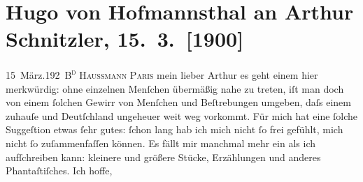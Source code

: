 

         
         \renewcommand{\erwaehntePersonen}{Personen: Richard Beer-Hofmann, Anatole France, Paul Goldmann, Hugo von Hofmannsthal, Hugo August von Hofmannsthal, Maurice Maeterlinck, Theofrastus Bombastus Paracelsus, Marie Reinhard, Auguste Rodin}
         \renewcommand{\erwaehnteOrte}{Orte: Berlin, Bois de Boulogne, Boulevard Haussmann, Deutschland, Florenz, Meudon, Paris, Villennes-sur-Seine, Wien}
         \renewcommand{\erwaehnteWerke}{Werke: Antigone, Paracelsus und Dr. Schnitzler, Vorspiel zur Antigone des Sophokles}
               \section[Hugo von Hofmannsthal an Arthur Schnitzler, 15. 3. {[}1900{]}]{ Hugo von Hofmannsthal an Arthur Schnitzler, 15. 3. {[}1900{]}}\nopagebreak{}\rehead{ }\begin{ledgroupsized}[t]{13cm}\normalsize\beginnumbering \toendnotes[C]{\smallbreak\pagebreak[2]} 
\toendnotes[C]{\smallbreak}\pstart
           \noindent{}{\pb}15 März.\hfill \textsc{192 B\textsuperscript{d}
                           Haussmann}\pend
           \pstart
           \raggedleft{}\textsc{Paris}\pend
           \pstart{}mein lieber Arthur\pend\pstart
           es geht einem hier merkwürdig: ohne einzelnen Menſchen übermäßig nahe zu treten, iſt
               man doch von einem ſolchen Gewirr von Menſchen und Beſtrebungen umgeben, daſs einem
               zuhauſe und Deutſchland ungeheuer weit weg
               vorkommt. Für mich hat eine ſolche Suggeſtion etwas ſehr gutes: ſchon lang hab ich
               mich nicht ſo frei gefühlt, mich {\pb}nicht ſo zuſammenfaſſen können. Es fällt mir manchmal mehr ein als ich aufſchreiben
               kann: kleinere und größere Stücke, Erzählungen und anderes Phantaſtiſches. Ich hoffe,

\end{ledgroupsized}
